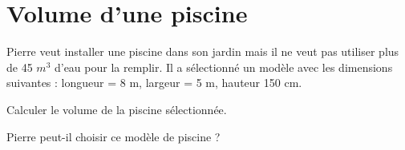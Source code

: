 \section{Volume d'une piscine}

Pierre veut installer une piscine dans son jardin mais il ne veut pas utiliser plus de 45 $m^3$ d'eau pour la remplir. Il a sélectionné un modèle avec les dimensions suivantes : longueur = 8 m, largeur = 5 m, hauteur 150 cm.

\begin{questions}
	\question Calculer le volume de la piscine sélectionnée.
	\begin{solution}
	\end{solution}
	
	\question Pierre peut-il choisir ce modèle de piscine ?
	\begin{solution}
		
	\end{solution}
\end{questions}